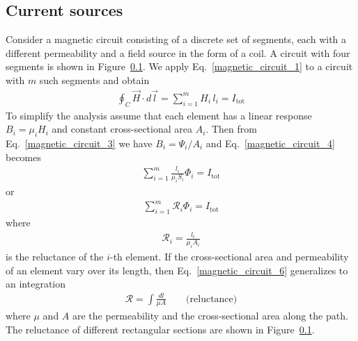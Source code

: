 \documentclass[11pt,a4paper,oneside]{book}
\numberwithin{equation}{section}
\theoremstyle{it}
\theoremstyle{definition}
\begin{document}
\subsection{Current sources}
Consider a magnetic circuit consisting of a discrete set of segments, each with a different permeability and a field source in the form of a coil. A circuit with four segments is shown in Figure~\ref{}. We apply Eq.~\eqref{magnetic_circuit_1} to a circuit with $m$ such segments and obtain
\begin{equation}\label{magnetic_circuit_4}
	{\begin{aligned}
			\oint_{C} \vec{H}\cdot d\vec{l} = \sum_{i=1}^{m} H_i\,l_i = I_\text{tot}
	\end{aligned}}
\end{equation} 
To simplify the analysis assume that each element has a linear response $B_i=\mu_iH_i$ and constant cross-sectional area $A_i$. Then from Eq.~\eqref{magnetic_circuit_3} we have $B_i=\Psi_i/A_i$ and Eq.~\eqref{magnetic_circuit_4} becomes
\begin{equation}\label{magnetic_circuit_5}
	{\begin{aligned}
			\sum_{i=1}^{m}\frac{l_i}{\mu_iS_i}\Phi_i = I_\text{tot}
	\end{aligned}}
\end{equation} 
or
\begin{equation*}\label{}
{\begin{aligned}
		\sum_{i=1}^{m}\mathscr{R}_i\Phi_i = I_\text{tot}
\end{aligned}}
\end{equation*} 
where
\begin{equation}\label{magnetic_circuit_6}
{\begin{aligned}
		\mathscr{R}_i=\frac{l_i}{\mu_i A_i}
\end{aligned}}
\end{equation} 
is the reluctance of the $i$-th element. If the cross-sectional area and permeability of an element vary over its length, then Eq.~\eqref{magnetic_circuit_6} generalizes to an integration
\begin{equation*}\label{}
	{\begin{aligned}
			\mathscr{R}=\int\frac{dl}{\mu A}\qquad\text{(reluctance)}
	\end{aligned}}
\end{equation*} 
where $\mu$ and $A$ are the permeability and the cross-sectional area along the path. The reluctance of different rectangular sections are shown in Figure~\ref{}.
\end{document}
